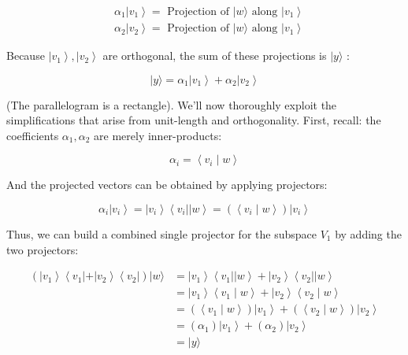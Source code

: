 \documentclass[main.tex]{subfiles}
\begin{document}
    $$
    \begin{aligned}
    &\alpha_{1}\left|v_{1}\right\rangle=\text { Projection of }|w\rangle \text { along }\left|v_{1}\right\rangle \\
    &\alpha_{2}\left|v_{2}\right\rangle=\text { Projection of }|w\rangle \text { along }\left|v_{1}\right\rangle
    \end{aligned}
    $$
    
    Because $\left|v_{1}\right\rangle,\left|v_{2}\right\rangle$ are orthogonal, the sum of these projections is $|y\rangle$ :
    
    $$
    |y\rangle=\alpha_{1}\left|v_{1}\right\rangle+\alpha_{2}\left|v_{2}\right\rangle
    $$
    
    (The parallelogram is a rectangle). We'll now thoroughly exploit the simplifications that arise from unit-length and orthogonality. First, recall: the coefficients $\alpha_{1}, \alpha_{2}$ are merely inner-products:
    
    $$
    \alpha_{i}=\left\langle v_{i} \mid w\right\rangle
    $$
    
    And the projected vectors can be obtained by applying projectors:
    
    $$
    \alpha_{i}\left|v_{i}\right\rangle=\left|v_{i}\right\rangle\left\langle v_{i}|| w\right\rangle=\left(\left\langle v_{i} \mid w\right\rangle\right)\left|v_{i}\right\rangle
    $$
    
    Thus, we can build a combined single projector for the subspace $V_{1}$ by adding the two projectors:
    
    $$
    \begin{aligned}
    \left(\left|v_{1}\right\rangle\left\langle v_{1}|+| v_{2}\right\rangle\left\langle v_{2}\right|\right)|w\rangle &=\left|v_{1}\right\rangle\left\langle v_{1}|| w\right\rangle+\left|v_{2}\right\rangle\left\langle v_{2}|| w\right\rangle \\
    &=\left|v_{1}\right\rangle\left\langle v_{1} \mid w\right\rangle+\left|v_{2}\right\rangle\left\langle v_{2} \mid w\right\rangle \\
    &=\left(\left\langle v_{1} \mid w\right\rangle\right)\left|v_{1}\right\rangle+\left(\left\langle v_{2} \mid w\right\rangle\right)\left|v_{2}\right\rangle \\
    &=\left(\alpha_{1}\right)\left|v_{1}\right\rangle+\left(\alpha_{2}\right)\left|v_{2}\right\rangle \\
    &=|y\rangle
    \end{aligned}
    $$
    
\end{document}
